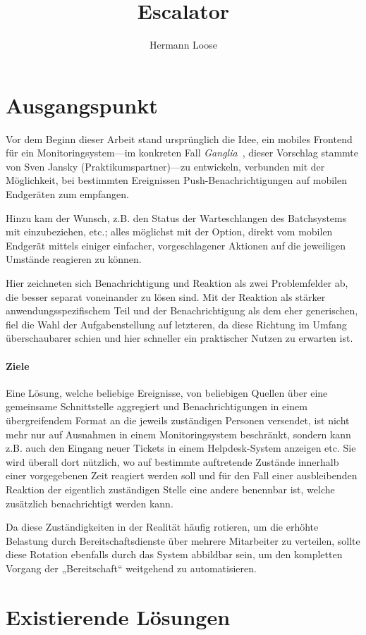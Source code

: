 \documentclass[11pt,utf8,notoc,bibnum,german,final]{zihpub}
\title{Escalator}
\author{Hermann Loose}
\begin{document}
\section{Ausgangspunkt}

Vor dem Beginn dieser Arbeit stand ursprünglich die Idee, ein mobiles Frontend
für ein Monitoringsystem—im konkreten Fall \emph{Ganglia}~\cite{ganglia},
dieser Vorschlag stammte von Sven Jansky (Praktikumspartner)—zu
entwickeln, verbunden mit der Möglichkeit, bei bestimmten Ereignissen
Push-Benach\-richti\-gungen auf mobilen Endgeräten zum empfangen.

Hinzu kam der Wunsch, z.B. den Status der Warteschlangen des Batchsystems mit
einzubeziehen, etc.; alles möglichst mit der Option, direkt vom mobilen
Endgerät mittels einiger einfacher, vorgeschlagener Aktionen auf die jeweiligen
Umstände reagieren zu können.

Hier zeichneten sich Benachrichtigung und Reaktion als zwei Problemfelder ab,
die besser separat voneinander zu lösen sind. Mit der Reaktion als stärker
anwendungsspezifischem Teil und der Benachrichtigung als dem eher generischen,
fiel die Wahl der Aufgabenstellung auf letzteren, da diese Richtung im Umfang
überschaubarer schien und hier schneller ein praktischer Nutzen zu erwarten
ist.

\paragraph{Ziele}

Eine Lösung, welche beliebige Ereignisse, von beliebigen Quellen über eine
gemeinsame Schnittstelle aggregiert und Benachrichtigungen in einem
übergreifendem Format an die jeweils zuständigen Personen versendet, ist nicht
mehr nur auf Ausnahmen in einem Monitoringsystem beschränkt, sondern kann z.B.
auch den Eingang neuer Tickets in einem Helpdesk-System anzeigen etc. Sie wird
überall dort nützlich, wo auf bestimmte auftretende Zustände innerhalb einer
vorgegebenen Zeit reagiert werden soll und für den Fall einer ausbleibenden
Reaktion der eigentlich zuständigen Stelle eine andere benennbar ist, welche
zusätzlich benachrichtigt werden kann.

Da diese Zuständigkeiten in der Realität häufig rotieren, um die erhöhte
Belastung durch Bereitschaftsdienste über mehrere Mitarbeiter zu verteilen,
sollte diese Rotation ebenfalls durch das System abbildbar sein, um den
kompletten Vorgang der „Bereitschaft“ weitgehend zu automatisieren.

\section{Existierende Lösungen}
\end{document}
